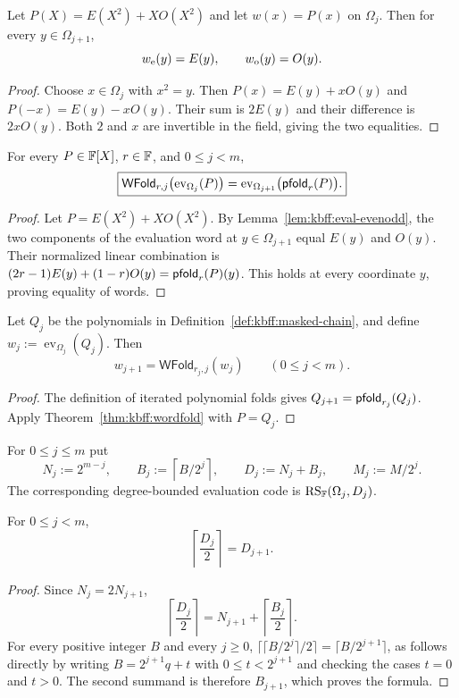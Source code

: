 \begin{lemma}\label{lem:kbff:eval-evenodd}
Let $P(X)=E(X^2)+XO(X^2)$ and let $w(x)=P(x)$ on $\Omega_j$.
Then for every $y\in\Omega_{j+1}$,
\[
 w_{\rm e}(y)=E(y),\qquad w_{\rm o}(y)=O(y).
\]
\end{lemma}
\begin{proof}
Choose $x\in\Omega_j$ with $x^2=y$. Then
$P(x)=E(y)+xO(y)$ and $P(-x)=E(y)-xO(y)$.
Their sum is $2E(y)$ and their difference is $2xO(y)$.
Both $2$ and $x$ are invertible in the field, giving the two equalities.
\end{proof}

\begin{theorem}\label{thm:kbff:wordfold}
For every $P\in\mathbb{F}[X]$, $r\in\mathbb{F}$, and $0\leq j<m$,
\[
 \boxed{
 \mathsf{WFold}_{r,j}\bigl(\operatorname{ev}_{\Omega_j}(P)\bigr)
 =\operatorname{ev}_{\Omega_{j+1}}\bigl(\mathsf{pfold}_r(P)\bigr).
 }
\]
\end{theorem}
\begin{proof}
Let $P=E(X^2)+XO(X^2)$. By Lemma~\ref{lem:kbff:eval-evenodd},
the two components of the evaluation word at $y\in\Omega_{j+1}$
equal $E(y)$ and $O(y)$. Their normalized linear combination is
$(2r-1)E(y)+(1-r)O(y)=\mathsf{pfold}_r(P)(y)$.
This holds at every coordinate $y$, proving equality of words.
\end{proof}

\begin{corollary}\label{cor:kbff:wordchain}
Let $Q_j$ be the polynomials in Definition~\ref{def:kbff:masked-chain},
and define $w_j:=\operatorname{ev}_{\Omega_j}(Q_j)$. Then
\[
 w_{j+1}=\mathsf{WFold}_{r_j,j}(w_j)\qquad(0\leq j<m).
\]
\end{corollary}
\begin{proof}
The definition of iterated polynomial folds gives
$Q_{j+1}=\mathsf{pfold}_{r_j}(Q_j)$. Apply Theorem~\ref{thm:kbff:wordfold}
with $P=Q_j$.
\end{proof}

\begin{definition}\label{def:kbff:degree-budgets}
For $0\leq j\leq m$ put
\[
 N_j:=2^{m-j},\qquad B_j:=\left\lceil B/2^j\right\rceil,
 \qquad D_j:=N_j+B_j,
 \qquad M_j:=M/2^j.
\]
The corresponding degree-bounded evaluation code is
$\operatorname{RS}_{\mathbb{F}}(\Omega_j,D_j)$.
\end{definition}

\begin{lemma}\label{lem:kbff:budget-recurrence}
For $0\leq j<m$,
\[
 \left\lceil\frac{D_j}{2}\right\rceil=D_{j+1}.
\]
\end{lemma}
\begin{proof}
Since $N_j=2N_{j+1}$,
\[
 \left\lceil\frac{D_j}{2}\right\rceil
 =N_{j+1}+\left\lceil\frac{B_j}{2}\right\rceil.
\]
For every positive integer $B$ and every $j\geq0$,
$\lceil\lceil B/2^j\rceil/2\rceil=\lceil B/2^{j+1}\rceil$,
as follows directly by writing $B=2^{j+1}q+t$ with
$0\leq t<2^{j+1}$ and checking the cases $t=0$ and $t>0$.
The second summand is therefore $B_{j+1}$, which proves the formula.
\end{proof}

